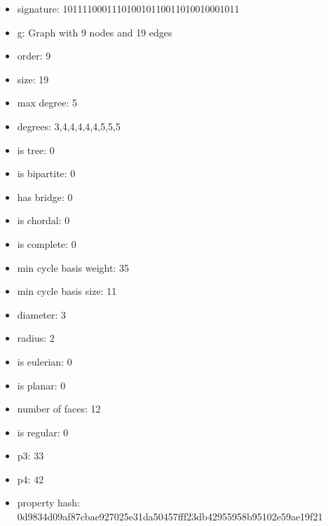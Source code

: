 \newpage
\begin{figure}
\end{figure}
\begin{itemize}
\item signature: 101111000111010010110011010010001011
\item g: Graph with 9 nodes and 19 edges
\item order: 9
\item size: 19
\item max degree: 5
\item degrees: 3,4,4,4,4,4,5,5,5
\item is tree: 0
\item is bipartite: 0
\item has bridge: 0
\item is chordal: 0
\item is complete: 0
\item min cycle basis weight: 35
\item min cycle basis size: 11
\item diameter: 3
\item radius: 2
\item is eulerian: 0
\item is planar: 0
\item number of faces: 12
\item is regular: 0
\item p3: 33
\item p4: 42
\item property hash: 0d9834d09af87cbae927025e31da50457fff23db42955958b95102e59ae19f21
\end{itemize}
